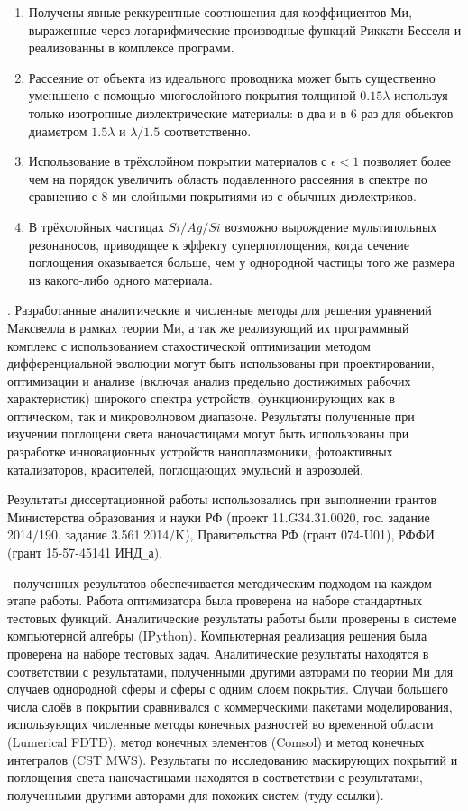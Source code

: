 \begin{enumerate}
  \item Получены явные реккурентные соотношения для коэффициентов Ми,
    выраженные через логарифмические производные функций Риккати-Бесселя
    и реализованны в комплексе
    программ. %
  \item Рассеяние от объекта из идеального проводника может быть
    существенно уменьшено с помощью многослойного покрытия толщиной
    $0.15\lambda$ используя только изотропные диэлектрические
    материалы: в два и в 6 раз для объектов диаметром $1.5\lambda$ и
    $\lambda/1.5$ соответственно.
  \item Использование в трёхслойном покрытии материалов с
    $\epsilon < 1$ позволяет более чем на порядок увеличить область
    подавленного рассеяния в спектре по сравнению с 8-ми слойными
    покрытиями из с обычных диэлектриков.
  \item В трёхслойных частицах $Si/Ag/Si$ возможно вырождение
    мультипольных резонаносов, приводящее к эффекту
    суперпоглощения, когда сечение поглощения оказывается больше, чем
    у однородной частицы того же размера из какого-либо одного материала. 
\end{enumerate}


\influence. Разработанные аналитические и численные методы для решения
уравнений Максвелла в рамках теории Ми, а так же реализующий их
программный комплекс с использованием стахостической оптимизации
методом дифференциальной эволюции могут быть использованы при
проектировании, оптимизации и анализе (включая анализ предельно
достижимых рабочих характеристик) широкого спектра устройств,
функционирующих как в оптическом, так и микроволновом диапазоне.
Результаты полученные при изучении поглощени света наночастицами могут
быть использованы при разработке инновационных устройств
наноплазмоники, фотоактивных катализаторов, красителей, поглощающих
эмульсий и аэрозолей.

Результаты диссертационной работы использовались при выполнении
грантов Министерства образования и науки РФ
(проект 11.G34.31.0020, гос. задание 2014/190, задание 3.561.2014/K),
Правительства РФ (грант 074-U01), РФФИ (грант 15-57-45141 ИНД\verb+_+а).


\reliability\ полученных результатов обеспечивается методическим
подходом на каждом этапе работы. Работа оптимизатора была проверена на
наборе стандартных тестовых функций. Аналитические результаты работы
были проверены в системе компьютерной алгебры (IPython). Компьютерная
реализация решения была проверена на наборе тестовых
задач. Аналитические результаты находятся в соответствии с
результатами, полученными другими авторами по теории Ми для случаев
однородной сферы и сферы с одним слоем покрытия.  Случаи большего
числа слоёв в покрытии сравнивался с коммерческими пакетами
моделирования, использующих численные методы конечных разностей во
временной области (Lumerical FDTD), метод конечных элементов (Comsol)
и метод конечных интегралов (CST MWS). Результаты по исследованию
маскирующих покрытий и поглощения света наночастицами находятся в
соответствии с результатами, полученными другими авторами для похожих
систем (туду ссылки).

